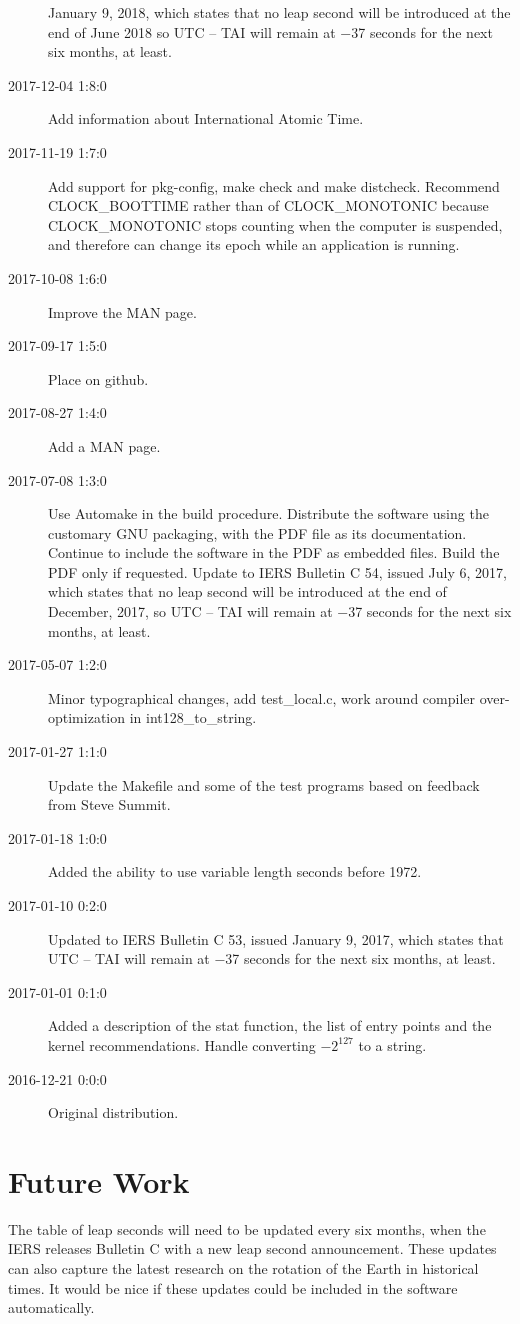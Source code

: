 \documentclass[letterpaper,twoside]{article}
\begin{document}
\begin{description}
  January 9, 2018, which states that no leap second will be introduced
  at the end of June 2018 so UTC -- TAI will remain at \num{-37} seconds
  for the next six months, at least.
\item[2017-12-04 1:8:0] Add information about International Atomic Time.
\item[2017-11-19 1:7:0] Add support for pkg-config, make check and
  make distcheck.  Recommend CLOCK\_BOOTTIME rather than of CLOCK\_MONOTONIC
  because CLOCK\_MONOTONIC stops counting when the computer is suspended,
  and therefore can change its epoch while an application is running.
\item[2017-10-08 1:6:0] Improve the MAN page.
\item[2017-09-17 1:5:0] Place on github.
\item[2017-08-27 1:4:0] Add a MAN page.
\item[2017-07-08 1:3:0] Use Automake in the build procedure.
  Distribute the software using the customary GNU packaging,
  with the PDF file as its documentation.  Continue to include
  the software in the PDF as embedded files.  Build the PDF
  only if requested.  Update to IERS Bulletin C 54, issued
  July 6, 2017, which states that no leap second will be introduced
  at the end of December, 2017, so UTC -- TAI will remain at
  \num{-37} seconds for the next six months, at least.
\item[2017-05-07 1:2:0] Minor typographical changes, add test\_local.c,
  work around compiler over-optimization in int128\_to\_string.
\item[2017-01-27 1:1:0] Update the Makefile and some of the test programs
  based on feedback from Steve Summit.
\item[2017-01-18 1:0:0] Added the ability to use variable length seconds
  before 1972.
\item[2017-01-10 0:2:0] Updated to IERS Bulletin C 53,
  issued January 9, 2017, which states that UTC -- TAI
  will remain at \num{-37} seconds for the next six months, at least.
\item[2017-01-01 0:1:0] Added a description of the stat function,
  the list of entry points and the kernel recommendations.
  Handle converting $-2^{127}$ to a string. 
\item[2016-12-21 0:0:0] Original distribution.
\end{description}

\section{Future Work}
The table of leap seconds will need to be updated every six months,
when the IERS releases Bulletin C with a new leap second announcement.
These updates can also capture the latest research on the rotation
of the Earth in historical times.  It would be nice if these updates
could be included in the software automatically.
\end{document}
